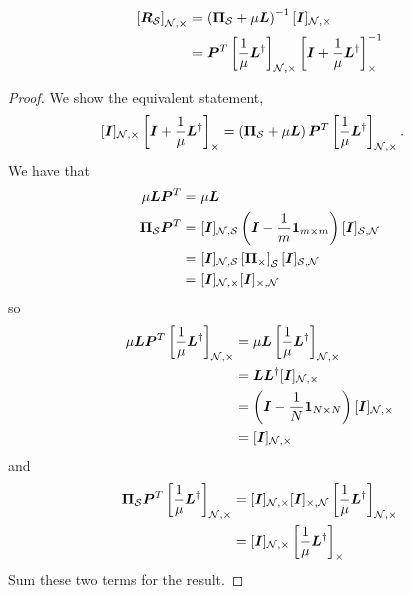 \begin{align}
    \msub[N,\Theta]{\matr{R}_{\set{S}}} &= \left(\proj{S} + \mu\matr{L}\right)^{-1}\matrsub[N,\Theta]{I}  \\
    &= \matr{P}^{T}\msub[N,\Theta]{\frac{1}{\mu}\matr{L}^{\dagger}}\msub[\Theta]{\matr{I} + \frac{1}{\mu}\matr{L}^{\dagger}}^{-1} \label{eq:GLR_Proof:explicit_submatrix}
\end{align}
\begin{proof}
    We show the equivalent statement,
    \begin{align}
        \matrsub[N,\Theta]{I} \msub[\Theta]{\matr{I} + \frac{1}{\mu}\matr{L}^{\dagger}} &= \left( \proj{S} + \mu\matr{L}\right)\matr{P}^{T}\msub[N,\Theta]{\frac{1}{\mu}\matr{L}^{\dagger}}.
    \end{align}
We have that
\begin{align}
    \mu\matr{L}\matr{P}^{T} &= \mu\matr{L} \\
    \proj{S}\matr{P}^{T} &= \matrsub[N,S]{I} \left( \matr{I} - \frac{1}{m}\matr{1}_{m \times m}\right)\matrsub[S,N]{I} \\
    &= \matrsub[N,S]{I} \msub[S]{\proj{\Theta}}\matrsub[S,N]{I} \\
    &= \matrsub[N,\Theta]{I} \matrsub[\Theta,N]{I}
\end{align}
so 
\begin{align}
\mu\matr{L}\matr{P}^{T} \msub[N,\Theta]{\frac{1}{\mu}\matr{L}^{\dagger}} &= \mu\matr{L} \msub[N,\Theta]{\frac{1}{\mu}\matr{L}^{\dagger}} \\
&= \matr{L}\matr{L}^{\dagger}\matrsub[N,\Theta]{I} \\
&= \left( \matr{I} - \frac{1}{N}\matr{1}_{N \times N}\right)\matrsub[N,\Theta]{I} \\
&= \matrsub[N,\Theta]{I} 
\end{align}
and
\begin{align}
    \proj{S} \matr{P}^{T}\msub[N,\Theta]{\frac{1}{\mu}\matr{L}^{\dagger}} &= \matrsub[N,\Theta]{I} \matrsub[\Theta,N]{I}\msub[N,\Theta]{\frac{1}{\mu}\matr{L}^{\dagger}} \\
    &= \matrsub[N,\Theta]{I} \msub[\Theta]{\frac{1}{\mu}\matr{L}^{\dagger}}
\end{align}
Sum these two terms for the result.
\end{proof}
